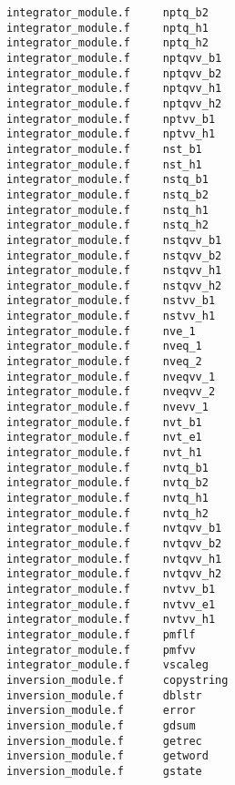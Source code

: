 \begin{verbatim}
integrator_module.f     nptq_b2                   
integrator_module.f     nptq_h1                   
integrator_module.f     nptq_h2                   
integrator_module.f     nptqvv_b1                 
integrator_module.f     nptqvv_b2                 
integrator_module.f     nptqvv_h1                 
integrator_module.f     nptqvv_h2                 
integrator_module.f     nptvv_b1                  
integrator_module.f     nptvv_h1                  
integrator_module.f     nst_b1                    
integrator_module.f     nst_h1                    
integrator_module.f     nstq_b1                   
integrator_module.f     nstq_b2                   
integrator_module.f     nstq_h1                   
integrator_module.f     nstq_h2                   
integrator_module.f     nstqvv_b1                 
integrator_module.f     nstqvv_b2                 
integrator_module.f     nstqvv_h1                 
integrator_module.f     nstqvv_h2                 
integrator_module.f     nstvv_b1                  
integrator_module.f     nstvv_h1                  
integrator_module.f     nve_1                     
integrator_module.f     nveq_1                    
integrator_module.f     nveq_2                    
integrator_module.f     nveqvv_1                  
integrator_module.f     nveqvv_2                  
integrator_module.f     nvevv_1                   
integrator_module.f     nvt_b1                    
integrator_module.f     nvt_e1                    
integrator_module.f     nvt_h1                    
integrator_module.f     nvtq_b1                   
integrator_module.f     nvtq_b2                   
integrator_module.f     nvtq_h1                   
integrator_module.f     nvtq_h2                   
integrator_module.f     nvtqvv_b1                 
integrator_module.f     nvtqvv_b2                 
integrator_module.f     nvtqvv_h1                 
integrator_module.f     nvtqvv_h2                 
integrator_module.f     nvtvv_b1                  
integrator_module.f     nvtvv_e1                  
integrator_module.f     nvtvv_h1                  
integrator_module.f     pmflf                     
integrator_module.f     pmfvv                     
integrator_module.f     vscaleg                   
inversion_module.f      copystring                
inversion_module.f      dblstr                    
inversion_module.f      error                     
inversion_module.f      gdsum                     
inversion_module.f      getrec                    
inversion_module.f      getword                   
inversion_module.f      gstate                    

\end{verbatim}
